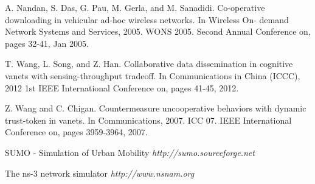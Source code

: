 \documentclass{acm_proc_article-sp}
\begin{document}
\begin{thebibliography}{1}
A. Nandan, S. Das, G. Pau, M. Gerla, and M. Sanadidi. Co-operative downloading in vehicular ad-hoc wireless networks. In Wireless On- demand Network Systems and Services, 2005. WONS 2005. Second Annual Conference on, pages 32-41, Jan 2005.

T. Wang, L. Song, and Z. Han. Collaborative data dissemination in cognitive vanets with sensing-throughput tradeoff. In Communications in China (ICCC), 2012 1st IEEE International Conference on, pages 41-45, 2012.

Z. Wang and C. Chigan. Countermeasure uncooperative behaviors with dynamic trust-token in vanets. In Communications, 2007. ICC 07. IEEE International Conference on, pages 3959-3964, 2007.

SUMO - Simulation of Urban Mobility {\em http://sumo.sourceforge.net}

The ns-3 network simulator {\em http://www.nsnam.org}

\end{thebibliography}
\end{document}
